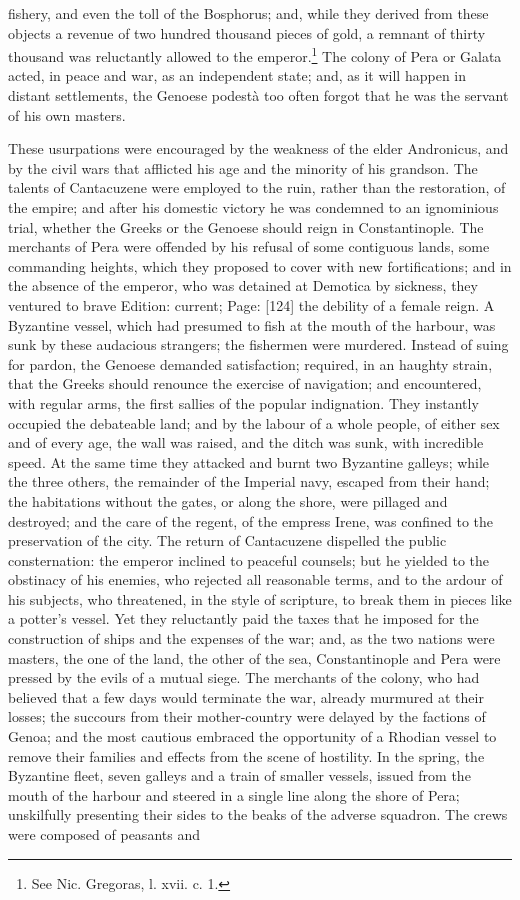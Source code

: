 fishery, and even the toll of the Bosphorus; and, while they derived from these objects a revenue of two hundred thousand pieces of gold, a remnant of thirty thousand was reluctantly allowed to the emperor.\footnote{See Nic. Gregoras, l. xvii. c. 1.} The colony of Pera or Galata acted, in peace and war, as an independent state; and, as it will happen in distant settlements, the Genoese podestà too often forgot that he was the servant of his own masters.

These usurpations were encouraged by the weakness of the elder Andronicus, and by the civil wars that afflicted his age and the minority of his grandson. The talents of Cantacuzene were employed to the ruin, rather than the restoration, of the empire; and after his domestic victory he was condemned to an ignominious trial, whether the Greeks or the Genoese should reign in Constantinople. The merchants of Pera were offended by his refusal of some contiguous lands, some commanding heights, which they proposed to cover with new fortifications; and in the absence of the emperor, who was detained at Demotica by sickness, they ventured to brave Edition: current; Page: [124] the debility of a female reign. A Byzantine vessel, which had presumed to fish at the mouth of the harbour, was sunk by these audacious strangers; the fishermen were murdered. Instead of suing for pardon, the Genoese demanded satisfaction; required, in an haughty strain, that the Greeks should renounce the exercise of navigation; and encountered, with regular arms, the first sallies of the popular indignation. They instantly occupied the debateable land; and by the labour of a whole people, of either sex and of every age, the wall was raised, and the ditch was sunk, with incredible speed. At the same time they attacked and burnt two Byzantine galleys; while the three others, the remainder of the Imperial navy, escaped from their hand; the habitations without the gates, or along the shore, were pillaged and destroyed; and the care of the regent, of the empress Irene, was confined to the preservation of the city. The return of Cantacuzene dispelled the public consternation: the emperor inclined to peaceful counsels; but he yielded to the obstinacy of his enemies, who rejected all reasonable terms, and to the ardour of his subjects, who threatened, in the style of scripture, to break them in pieces like a potter\texthebrew{}’s vessel. Yet they reluctantly paid the taxes that he imposed for the construction of ships and the expenses of the war; and, as the two nations were masters, the one of the land, the other of the sea, Constantinople and Pera were pressed by the evils of a mutual siege. The merchants of the colony, who had believed that a few days would terminate the war, already murmured at their losses; the succours from their mother-country were delayed by the factions of Genoa; and the most cautious embraced the opportunity of a Rhodian vessel to remove their families and effects from the scene of hostility. In the spring, the Byzantine fleet, seven galleys and a train of smaller vessels, issued from the mouth of the harbour and steered in a single line along the shore of Pera; unskilfully presenting their sides to the beaks of the adverse squadron. The crews were composed of peasants and 
